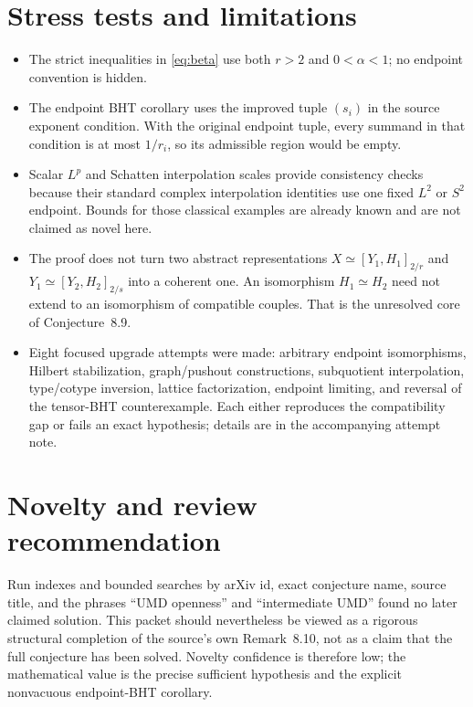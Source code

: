 \documentclass[11pt]{article}
\theoremstyle{definition}
\begin{document}
\section{Stress tests and limitations}

\begin{itemize}
\item The strict inequalities in \eqref{eq:beta} use both $r>2$ and
      $0<\alpha<1$; no endpoint convention is hidden.
\item The endpoint BHT corollary uses the improved tuple $(s_i)$ in the
      source exponent condition.  With the original endpoint tuple, every
      summand in that condition is at most $1/r_i$, so its admissible region
      would be empty.
\item Scalar $L^p$ and Schatten interpolation scales provide consistency
      checks because their standard complex interpolation identities use one
      fixed $L^2$ or $S^2$ endpoint.  Bounds for those classical examples are
      already known and are not claimed as novel here.
\item The proof does not turn two abstract representations
      $X\simeq[Y_1,H_1]_{2/r}$ and
      $Y_1\simeq[Y_2,H_2]_{2/s}$ into a coherent one.  An isomorphism
      $H_1\simeq H_2$ need not extend to an isomorphism of compatible couples.
      That is the unresolved core of Conjecture~8.9.
\item Eight focused upgrade attempts were made: arbitrary endpoint
      isomorphisms, Hilbert stabilization, graph/pushout constructions,
      subquotient interpolation, type/cotype inversion, lattice factorization,
      endpoint limiting, and reversal of the tensor-BHT counterexample.  Each
      either reproduces the compatibility gap or fails an exact hypothesis;
      details are in the accompanying attempt note.
\end{itemize}

\section{Novelty and review recommendation}

Run indexes and bounded searches by arXiv id, exact conjecture name, source
title, and the phrases ``UMD openness'' and ``intermediate UMD'' found no later
claimed solution.  This packet should nevertheless be viewed as a rigorous
structural completion of the source's own Remark~8.10, not as a claim that the
full conjecture has been solved.  Novelty confidence is therefore low; the
mathematical value is the precise sufficient hypothesis and the explicit
nonvacuous endpoint-BHT corollary.
\end{document}
